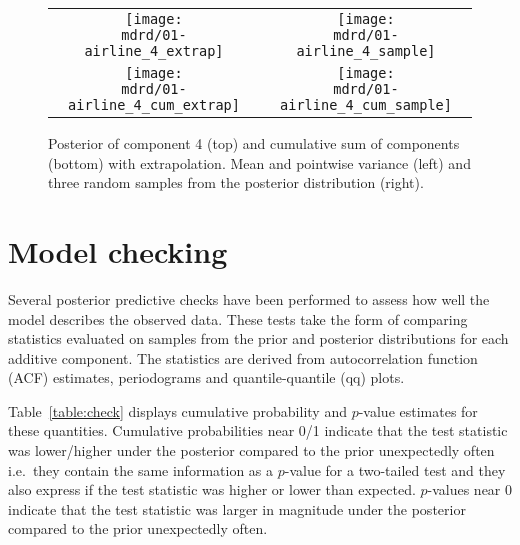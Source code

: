 \documentclass{article} %
\def\ie{i.e.\ }
\begin{document}


\begin{figure}[H]
\newcommand{\wmgd}{0.5\columnwidth}
\newcommand{\hmgd}{3.0cm}
\newcommand{\mdrd}{01-airline}
\newcommand{\mbm}{\hspace{-0.3cm}}
\begin{tabular}{cc}
\mbm \texttt{[image: \\mdrd/01-airline\_4\_extrap]} & \texttt{[image: \\mdrd/01-airline\_4\_sample]} \\
\mbm \texttt{[image: \\mdrd/01-airline\_4\_cum\_extrap]} & \texttt{[image: \\mdrd/01-airline\_4\_cum\_sample]}
\end{tabular}
\caption{Posterior of component 4 (top) and cumulative sum of components (bottom) with extrapolation. Mean and pointwise variance (left) and three random samples from the posterior distribution (right).}
\label{fig:extrap4}
\end{figure}

\section{Model checking}
\label{sec:check}

Several posterior predictive checks have been performed to assess how well the model describes the observed data.
These tests take the form of comparing statistics evaluated on samples from the prior and posterior distributions for each additive component.
The statistics are derived from autocorrelation function (ACF) estimates, periodograms and quantile-quantile (qq) plots.

Table~\ref{table:check} displays cumulative probability and $p$-value estimates for these quantities.
Cumulative probabilities near 0/1 indicate that the test statistic was lower/higher under the posterior compared to the prior unexpectedly often \ie they contain the same information as a $p$-value for a two-tailed test and they also express if the test statistic was higher or lower than expected.
$p$-values near 0 indicate that the test statistic was larger in magnitude under the posterior compared to the prior unexpectedly often.
\end{document}
